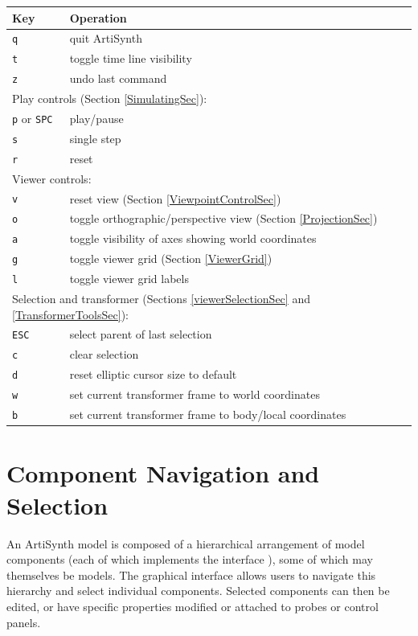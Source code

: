 \documentclass{article}
\begin{document}
\begin{center}
\begin{tabular}{|l|l|}
\hline
Key & Operation \\
\hline
{\tt q} & quit ArtiSynth \\
{\tt t} & toggle time line visibility \\
{\tt z} & undo last command \\
\hline
\multicolumn{2}{|l|}{Play controls (Section \ref{SimulatingSec}):}\\
\hline
{\tt p} or {\tt SPC} & play/pause\\
{\tt s} & single step \\
{\tt r} & reset \\
\hline
\multicolumn{2}{|l|}{Viewer controls:}\\
\hline
{\tt v} & reset view (Section \ref{ViewpointControlSec})\\
{\tt o} & toggle orthographic/perspective view 
(Section \ref{ProjectionSec})  \\
{\tt a} & toggle visibility of axes showing world coordinates\\
{\tt g} & toggle viewer grid (Section \ref{ViewerGrid})\\
{\tt l} & toggle viewer grid labels\\
\hline
\multicolumn{2}{|l|}{%
Selection and transformer (Sections \ref{viewerSelectionSec} 
and \ref{TransformerToolsSec}):}\\
\hline
{\tt ESC} & select parent of last selection\\
{\tt c} & clear selection\\
{\tt d} & reset elliptic cursor size to default\\
{\tt w} & set current transformer frame to world coordinates\\
{\tt b} & set current transformer frame to body/local coordinates\\
\hline
\end{tabular}
\end{center}

\section{Component Navigation and Selection}

An ArtiSynth model is composed of a hierarchical arrangement of
model components (each of which implements the interface 
), 
some of which may themselves
be models. The graphical interface allows users to navigate this
hierarchy and select individual components. Selected components
can then be edited, or have specific properties modified or attached
to probes or control panels.
\end{document}
